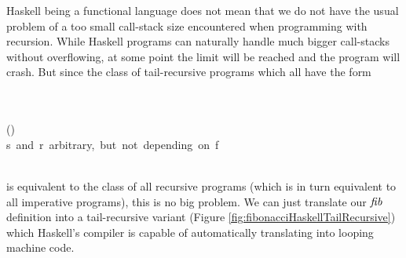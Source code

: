 \documentclass[paper=A4,twoside=true,openright,parskip=full,chapterprefix=true,headings=normal,bibliography=totoc,listof=totoc,titlepage=on,captions=tableabove,draft=false,british]{scrreprt}%
\begin{document}
Haskell being a functional language does not mean that we do not have
the usual problem of a too small call-stack size encountered when
programming with recursion. While Haskell programs can naturally handle
much bigger call-stacks without overflowing, at some point the limit
will be reached and the program will crash. But since the class of
tail-recursive programs which all have the form


\begin{hscode}\SaveRestoreHook
{}%
%
%
\>[B]{}\;\mathrel{=}\mathbin{<}\mathbin{>}{}\<[E]%
\\
\>[B]{}\<[7]%
\>[7]{}\;\;\<[E]%
\\
\>[B]{}\<[7]%
\>[7]{}\;\;(\;){}\<[E]%
\\[\blanklineskip]%
\>[B]{}\mbox{\onelinecomment  s and r arbitrary, but not depending on f}{}\<[E]%
\\
\>[B]{}\mathrel{=}\<[E]%
\\
\>[B]{}\mathrel{=}\<[E]%
\ColumnHook
\end{hscode}\resethooks
\vspace{-2\baselineskip}

is equivalent to the class of all recursive programs (which is in turn
equivalent to all imperative programs), this is no big problem. We can
just translate our \ensuremath{\Varid{fib}} definition into a tail-recursive variant
(Figure \ref{fig:fibonacciHaskellTailRecursive}) which Haskell's
compiler is capable of automatically translating into looping machine
code.
\end{document}

